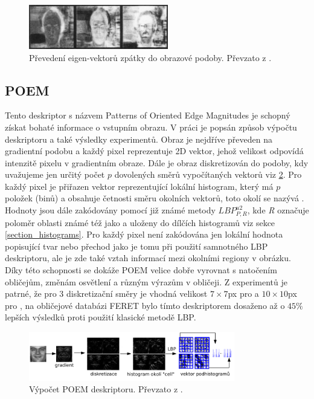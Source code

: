 \documentclass[czech,BP]{thesiskiv}
\begin{document}
\begin{figure}[h!]
\begin{center}
\includegraphics[width=230px]{img/eigen_vectors.png}
\caption{Převedení eigen-vektorů zpátky do obrazové podoby. Převzato z \cite{Turk1991}.}
\label{fig:eigen_vectors}
\end{center}
\end{figure}

\subsection{POEM} \label{poem}
Tento deskriptor s názvem Patterns of Oriented Edge Magnitudes je schopný získat bohaté informace o vstupním obrazu. V práci \cite{Alice2010} je popsán způsob výpočtu deskriptoru a také výsledky experimentů. Obraz je nejdříve převeden na gradientní podobu a každý pixel reprezentuje 2D vektor, jehož velikost odpovídá intenzitě pixelu v gradientním obraze. Dále je obraz diskretizován do podoby, kdy uvažujeme jen určitý počet $p$ dovolených směrů vypočítaných vektorů viz \ref{fig:poem_calculation}. Pro každý pixel je přiřazen vektor reprezentující lokální histogram, který má $p$ položek (binů) a obsahuje četnosti směru okolních vektorů, toto okolí se nazývá . Hodnoty jsou dále zakódovány pomocí již známé metody $LBP_{P,R}^{u2}$, kde \textit{R} označuje poloměr oblasti známé též jako  a uloženy do dílčích histogramů viz sekce \ref{section_histograms}. Pro každý pixel není zakódována jen lokální hodnota popisující tvar nebo přechod jako je tomu při použití samnotného LBP deskriptoru, ale je zde také vztah informací mezi okolními regiony v obrázku. Díky této schopnosti se dokáže POEM velice dobře vyrovnat s natočením obličejům, změnám osvětlení a různým výrazům v obličeji. Z experimentů \cite{Alice2010} je patrné, že pro 3 diskretizační směry je vhodná velikost $7\times 7$px pro  a $10\times 10$px pro , na obličejové databázi FERET bylo tímto deskriptorem dosaženo až o $45\%$ lepších výsledků proti použití klasické metodě LBP.

\begin{figure}[h!]
\begin{center}
\includegraphics[width=340px]{img/poem.png}
\caption{Výpočet POEM deskriptoru. Převzato z \cite{Alice2010}.}
\label{fig:poem_calculation}
\end{center}
\end{figure}
\end{document}
